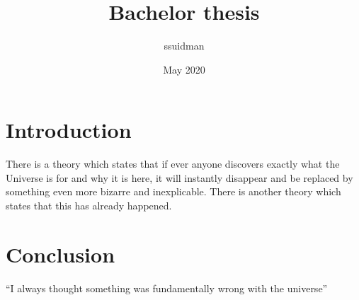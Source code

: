 \documentclass{article}
\title{Bachelor thesis}
\author{ssuidman }
\date{May 2020}
\begin{document}
\maketitle

\section{Introduction}
There is a theory which states that if ever anyone discovers exactly what the Universe is for and why it is here, it will instantly disappear and be replaced by something even more bizarre and inexplicable.
There is another theory which states that this has already happened.

\section{Conclusion}
``I always thought something was fundamentally wrong with the universe'' \citep{adams1995hitchhiker}




\end{document}
